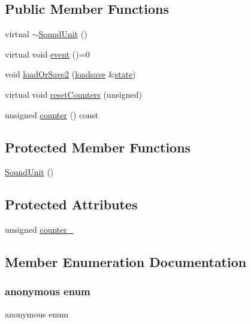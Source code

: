 \subsection*{Public Member Functions}
\begin{DoxyCompactItemize}
\item 
virtual \hyperlink{classgambatte_1_1SoundUnit_a4eee8be8027fbbc20a13bfe27b68f74a}{$\sim$\+Sound\+Unit} ()
\item 
virtual void \hyperlink{classgambatte_1_1SoundUnit_a8ad6df87fc3700d9d3bee470383197b4}{event} ()=0
\item 
void \hyperlink{classgambatte_1_1SoundUnit_a3f33fea3fbb7987029b74cbc64d7668f}{load\+Or\+Save2} (\hyperlink{classgambatte_1_1loadsave}{loadsave} \&\hyperlink{ppu_8cpp_a2f2eca6997ee7baf8901725ae074d45b}{state})
\item 
virtual void \hyperlink{classgambatte_1_1SoundUnit_a3baa270f75463b24cd79fe5970103d4f}{reset\+Counters} (unsigned)
\item 
unsigned \hyperlink{classgambatte_1_1SoundUnit_acad13952e5b24b3bc05b9aa42c8b9249}{counter} () const
\end{DoxyCompactItemize}
\subsection*{Protected Member Functions}
\begin{DoxyCompactItemize}
\item 
\hyperlink{classgambatte_1_1SoundUnit_ab5bdb53bbf42d92d6d47db012aec1577}{Sound\+Unit} ()
\end{DoxyCompactItemize}
\subsection*{Protected Attributes}
\begin{DoxyCompactItemize}
\item 
unsigned \hyperlink{classgambatte_1_1SoundUnit_a06297f078dca7d403648ce3455a790be}{counter\+\_\+}
\end{DoxyCompactItemize}


\subsection{Member Enumeration Documentation}
\mbox{\label{classgambatte_1_1SoundUnit_a42980887d13053bdf6dfbdbece460ff8}} 
\subsubsection{\texorpdfstring{anonymous enum}{anonymous enum}}
{\footnotesize\ttfamily anonymous enum}

